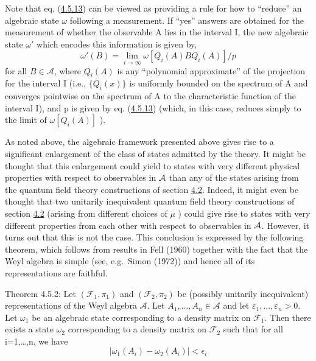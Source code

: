\documentclass[11pt,a4paper]{article}
\begin{document}
Note that eq. (\hyperref[eq:4.5.13]{4.5.13}) can be viewed as providing a rule for how to ``reduce'' an algebraic state \(\omega\) following a measurement. If ``yes'' answers are obtained for the measurement of whether the observable A lies in the interval I, the new algebraic state \(\omega'\) which \hypertarget{source-94}{} encodes this information is given by,
\begin{equation*}
\omega'(B) = \lim_{i \to \infty} \omega[Q_i(A) B Q_i(A)]/p \tag{4.5.15}\label{eq:4.5.15}
\end{equation*}
for all \(B \in \mathcal{A}\), where \(Q_i(A)\) is any ``polynomial approximate'' of the projection for the interval I (i.e., \(\{Q_i(x)\}\) is uniformly bounded on the spectrum of A and converges pointwise on the spectrum of A to the characteristic function of the interval I), and p is given by eq. (\hyperref[eq:4.5.13]{4.5.13}) (which, in this case, reduces simply to the limit of \(\omega[Q_i(A)]\) ).

As noted above, the algebraic framework presented above gives rise to a significant enlargement of the class of states admitted by the theory. It might be thought that this enlargement could yield to states with very different physical properties with respect to observables in \({\cal A}\) than any of the states arising from the quantum field theory constructions of section \hyperlink{sec:4.2}{4.2}. Indeed, it might even be thought that two unitarily inequivalent quantum field theory constructions of section \hyperlink{sec:4.2}{4.2} (arising from different choices of \(\mu\) ) could give rise to states with very different properties from each other with respect to observables in \({\cal A}\). However, it turns out that this is not the case. This conclusion is expressed by the following theorem, which follows from results in Fell (1960) together with the fact that the Weyl algebra is simple (see, e.g.~Simon (1972)) and hence all of its representations are faithful.

Theorem 4.5.2: Let \((\mathcal{F}_1, \pi_1)\) and \((\mathcal{F}_2, \pi_2)\) be (possibly unitarily inequivalent) representations of the Weyl algebra \(\mathcal{A}\). Let \(A_1, ..., A_n \in \mathcal{A}\) and let \(\varepsilon_1, ..., \varepsilon_n > 0\). Let \(\omega_1\) be an algebraic state corresponding to a density matrix on \(\mathcal{F}_1\). Then there exists a state \(\omega_2\) corresponding to a density matrix on \(\mathcal{F}_2\) such that for all i=1,\ldots,n, we have
\begin{equation*}
|\omega_1(A_i) - \omega_2(A_i)| < \epsilon_i \tag{4.5.16}\label{eq:4.5.16}
\end{equation*}
\end{document}
